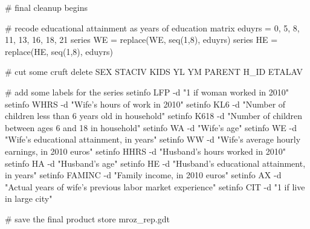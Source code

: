 \begin{code}
# final cleanup begins

# recode educational attainment as years of education
matrix eduyrs = {0, 5, 8, 11, 13, 16, 18, 21}
series WE = replace(WE, seq(1,8), eduyrs)
series HE = replace(HE, seq(1,8), eduyrs)

# cut some cruft
delete SEX STACIV KIDS YL YM PARENT H_ID ETALAV

# add some labels for the series
setinfo LFP -d "1 if woman worked in 2010"
setinfo WHRS -d "Wife's hours of work in 2010"
setinfo KL6 -d "Number of children less than 6 years old in household"
setinfo K618 -d "Number of children between ages 6 and 18 in household"
setinfo WA -d "Wife's age"
setinfo WE -d "Wife's educational attainment, in years"
setinfo WW -d "Wife's average hourly earnings, in 2010 euros"
setinfo HHRS -d "Husband's hours worked in 2010"
setinfo HA -d "Husband's age"
setinfo HE -d "Husband's educational attainment, in years"
setinfo FAMINC -d "Family income, in 2010 euros"
setinfo AX -d "Actual years of wife's previous labor market experience"
setinfo CIT -d "1 if live in large city"

# save the final product
store mroz_rep.gdt
\end{code}

    
